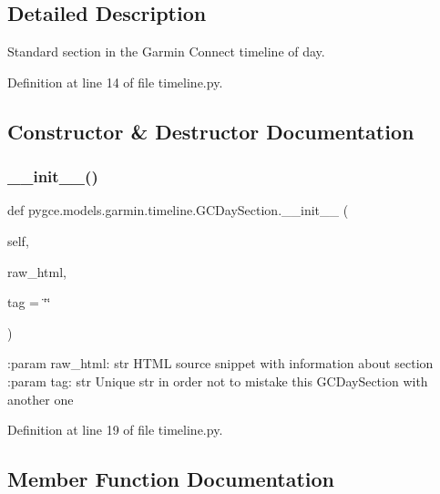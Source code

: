 \subsection{Detailed Description}
\begin{DoxyVerb}Standard section in the Garmin Connect timeline of day.
\end{DoxyVerb}
 

Definition at line 14 of file timeline.\+py.



\subsection{Constructor \& Destructor Documentation}
\mbox{\label{classpygce_1_1models_1_1garmin_1_1timeline_1_1_g_c_day_section_aae8c8c4a74381fa4ee47881ad498fb8f}} 
\subsubsection{\texorpdfstring{\+\_\+\+\_\+init\+\_\+\+\_\+()}{\_\_init\_\_()}}
{\footnotesize\ttfamily def pygce.\+models.\+garmin.\+timeline.\+G\+C\+Day\+Section.\+\_\+\+\_\+init\+\_\+\+\_\+ (\begin{DoxyParamCaption}\item[{}]{self,  }\item[{}]{raw\+\_\+html,  }\item[{}]{tag = {\ttfamily \char`\"{}\char`\"{}} }\end{DoxyParamCaption})}

\begin{DoxyVerb}:param raw_html: str
    HTML source snippet with information about section
:param tag: str
    Unique str in order not to mistake this GCDaySection with another one
\end{DoxyVerb}
 

Definition at line 19 of file timeline.\+py.



\subsection{Member Function Documentation}
\mbox{\label{classpygce_1_1models_1_1garmin_1_1timeline_1_1_g_c_day_section_ac1ddb2f5379e356e93166d1ea934b9c9}} 
